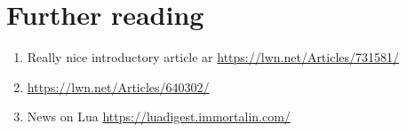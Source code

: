 \section{Further reading}

\begin{enumerate}
\item  Really nice introductory article ar \url{https://lwn.net/Articles/731581/}
\item   \url{https://lwn.net/Articles/640302/}
\item  News on Lua \url{https://luadigest.immortalin.com/}
\end{enumerate}










